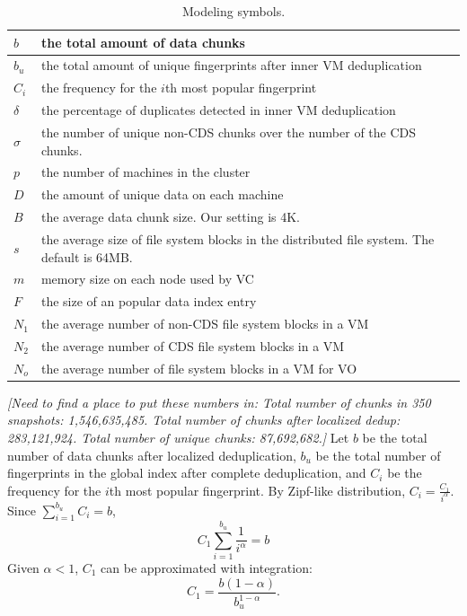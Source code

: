 \begin{table}[ht]
\centering
\begin{tabular}{|p{1.25cm}|p{6.5cm}|}
\hline
$b$ &  the total amount of data chunks\\ 
\hline
$b_u$ &  the total amount of unique fingerprints after inner VM  deduplication\\
\hline
$C_i$ &  the frequency for the $i$th most popular fingerprint\\
\hline
$\delta$ &  the percentage of duplicates detected in inner VM deduplication\\
\hline
$\sigma$ &  the number of unique non-CDS chunks over  the number of the CDS chunks.\\
\hline
$p$ & the number of machines in the cluster\\
\hline
$D$ & the amount of unique data on each machine\\
\hline
$B$ & the average data chunk size. Our setting is  4K.\\
\hline
$s$ & the average size of file system blocks in the distributed file system. The default is  64MB.\\
\hline
$m$ & memory size on each node used by VC\\ 
\hline
$F$ & the size of an popular data index entry\\
$N_1$ & the average number  of non-CDS file system blocks  in a VM\\
$N_2$ & the average number  of CDS file system blocks  in a VM\\
$N_o$ & the average number  of file system blocks  in a VM for VO\\
\hline
\end{tabular}
\caption{Modeling  symbols.}
\label{tab:symbol}
\end{table}

{\it [Need to find a place to put these numbers in: Total number of chunks in 350 snapshots: 1,546,635,485. Total number of chunks after localized dedup: 283,121,924. Total number of unique chunks: 87,692,682.]}
Let $b$ be the total number of data chunks after localized deduplication, 
$b_u$ be the total number of fingerprints 
in the global index after complete deduplication, and
$C_i$ be the frequency for the $i$th most popular fingerprint. 
By Zipf-like distribution, $C_i = \frac{C_1}{i^\alpha}.$
Since $ \sum_{i=1}^{b_u}C_i = b$,
\[
C_1 \sum_{i=1}^{b_u}\frac{1}{i^\alpha} = b
\]
Given $\alpha <1$, $C_1$ can be approximated with integration:
\begin{equation}
C_1=\frac{b(1-\alpha)}{b_u^{1-\alpha}}.
\end{equation}

